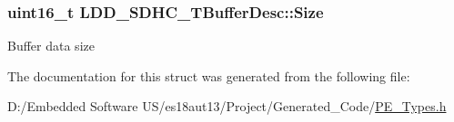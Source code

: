 \subsubsection[{Size}]{\setlength{\rightskip}{0pt plus 5cm}uint16\+\_\+t L\+D\+D\+\_\+\+S\+D\+H\+C\+\_\+\+T\+Buffer\+Desc\+::\+Size}\label{struct_l_d_d___s_d_h_c___t_buffer_desc_a117f5acff1ada72194a95b38795bca56}
Buffer data size 

The documentation for this struct was generated from the following file\+:\begin{DoxyCompactItemize}
\item 
D\+:/\+Embedded Software U\+S/es18aut13/\+Project/\+Generated\+\_\+\+Code/\hyperlink{_p_e___types_8h}{P\+E\+\_\+\+Types.\+h}\end{DoxyCompactItemize}
